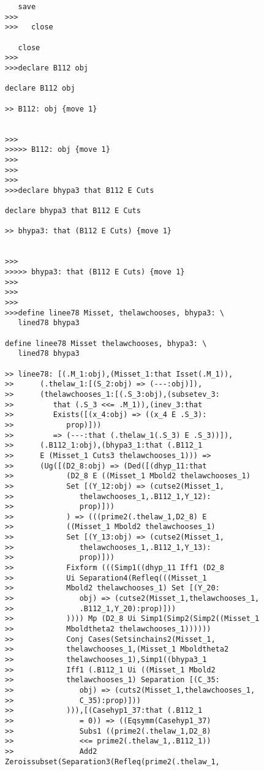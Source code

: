 \documentclass[12pt]{article}
\begin{document}
\begin{verbatim}
   save
>>>
>>>   close

   close
>>>
>>>declare B112 obj

declare B112 obj

>> B112: obj {move 1}


>>>
>>>>> B112: obj {move 1}
>>>
>>>
>>>
>>>declare bhypa3 that B112 E Cuts

declare bhypa3 that B112 E Cuts

>> bhypa3: that (B112 E Cuts) {move 1}


>>>
>>>>> bhypa3: that (B112 E Cuts) {move 1}
>>>
>>>
>>>
>>>define linee78 Misset, thelawchooses, bhypa3: \
   lined78 bhypa3

define linee78 Misset thelawchooses, bhypa3: \
   lined78 bhypa3

>> linee78: [(.M_1:obj),(Misset_1:that Isset(.M_1)),
>>      (.thelaw_1:[(S_2:obj) => (---:obj)]),
>>      (thelawchooses_1:[(.S_3:obj),(subsetev_3:
>>         that (.S_3 <<= .M_1)),(inev_3:that
>>         Exists([(x_4:obj) => ((x_4 E .S_3):
>>            prop)]))
>>         => (---:that (.thelaw_1(.S_3) E .S_3))]),
>>      (.B112_1:obj),(bhypa3_1:that (.B112_1
>>      E (Misset_1 Cuts3 thelawchooses_1))) =>
>>      (Ug([(D2_8:obj) => (Ded([(dhyp_11:that
>>            (D2_8 E ((Misset_1 Mbold2 thelawchooses_1)
>>            Set [(Y_12:obj) => (cutse2(Misset_1,
>>               thelawchooses_1,.B112_1,Y_12):
>>               prop)]))
>>            ) => (((prime2(.thelaw_1,D2_8) E
>>            ((Misset_1 Mbold2 thelawchooses_1)
>>            Set [(Y_13:obj) => (cutse2(Misset_1,
>>               thelawchooses_1,.B112_1,Y_13):
>>               prop)]))
>>            Fixform (((Simp1((dhyp_11 Iff1 (D2_8
>>            Ui Separation4(Refleq(((Misset_1
>>            Mbold2 thelawchooses_1) Set [(Y_20:
>>               obj) => (cutse2(Misset_1,thelawchooses_1,
>>               .B112_1,Y_20):prop)]))
>>            )))) Mp (D2_8 Ui Simp1(Simp2(Simp2((Misset_1
>>            Mboldtheta2 thelawchooses_1))))))
>>            Conj Cases(Setsinchains2(Misset_1,
>>            thelawchooses_1,(Misset_1 Mboldtheta2
>>            thelawchooses_1),Simp1((bhypa3_1
>>            Iff1 (.B112_1 Ui ((Misset_1 Mbold2
>>            thelawchooses_1) Separation [(C_35:
>>               obj) => (cuts2(Misset_1,thelawchooses_1,
>>               C_35):prop)]))
>>            ))),[(Casehyp1_37:that (.B112_1
>>               = 0)) => ((Eqsymm(Casehyp1_37)
>>               Subs1 ((prime2(.thelaw_1,D2_8)
>>               <<= prime2(.thelaw_1,.B112_1))
>>               Add2 Zeroissubset(Separation3(Refleq(prime2(.thelaw_1,

\end{verbatim}
\end{document}
